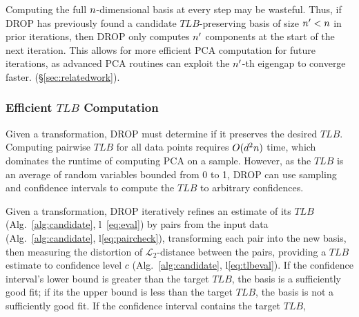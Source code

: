 Computing the full ${\color{black}n}$-dimensional basis at every step may be wasteful. 
Thus, if DROP has previously found a candidate $TLB$-preserving basis of size ${\color{black}n}' < {\color{black}n}$ in prior iterations, then DROP only computes ${\color{black}n}'$ components at the start of the next iteration.
This allows for more efficient PCA computation for future iterations, as advanced PCA routines can exploit the ${\color{black}n}'$-th eigengap to converge faster. (\S\ref{sec:relatedwork}).



\subsubsection{Efficient $TLB$ Computation}

Given a transformation, DROP must determine if it preserves the desired $TLB$.
Computing pairwise $TLB$ for all data points requires $O({\color{black}d}^2{\color{black}n})$ time, which dominates the runtime of computing PCA on a sample.
However, as the $TLB$ is an average of random variables bounded from 0 to 1, DROP can use sampling and confidence intervals to compute the $TLB$ to arbitrary confidences.

Given a transformation, DROP iteratively refines an estimate of its $TLB$ (Alg.~\ref{alg:candidate}, l~\ref{eq:eval}) by  pairs from the input data (Alg.~\ref{alg:candidate}, l\ref{eq:paircheck}), transforming each pair into the new basis, then measuring the distortion of $\mathcal{L}_2$-distance between the pairs, providing a $TLB$ estimate to confidence level $c$ (Alg.~\ref{alg:candidate}, l\ref{eq:tlbeval}). 
If the confidence interval's lower bound is greater than the target $TLB$, the basis is a sufficiently good fit; if its the upper bound is less than the target $TLB$, the basis is not a sufficiently good fit. 
If the confidence interval contains the target $TLB$,  

